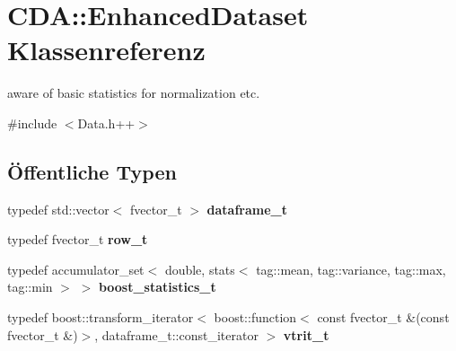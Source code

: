 \hypertarget{classCDA_1_1EnhancedDataset}{
\section{CDA::EnhancedDataset Klassenreferenz}
\label{classCDA_1_1EnhancedDataset}
}


aware of basic statistics for normalization etc.  




{\ttfamily \#include $<$Data.h++$>$}

\subsection*{Öffentliche Typen}
\begin{DoxyCompactItemize}
\item 
\hypertarget{classCDA_1_1EnhancedDataset_ac48f706bc85385da7b78ff9229666475}{
typedef std::vector$<$ fvector\_\-t $>$ {\bfseries dataframe\_\-t}}
\label{classCDA_1_1EnhancedDataset_ac48f706bc85385da7b78ff9229666475}

\item 
\hypertarget{classCDA_1_1EnhancedDataset_ad01be5e014bc9a5232102fae6759caad}{
typedef fvector\_\-t {\bfseries row\_\-t}}
\label{classCDA_1_1EnhancedDataset_ad01be5e014bc9a5232102fae6759caad}

\item 
\hypertarget{classCDA_1_1EnhancedDataset_ad125a62150f81238cd207baaa057b4ff}{
typedef accumulator\_\-set$<$ double, stats$<$ tag::mean, tag::variance, tag::max, tag::min $>$ $>$ {\bfseries boost\_\-statistics\_\-t}}
\label{classCDA_1_1EnhancedDataset_ad125a62150f81238cd207baaa057b4ff}

\item 
\hypertarget{classCDA_1_1EnhancedDataset_adecd4f314f8fc01ba75b08ca053ba561}{
typedef boost::transform\_\-iterator$<$ boost::function$<$ const fvector\_\-t \&(const fvector\_\-t \&)$>$, dataframe\_\-t::const\_\-iterator $>$ {\bfseries vtrit\_\-t}}
\label{classCDA_1_1EnhancedDataset_adecd4f314f8fc01ba75b08ca053ba561}

\end{DoxyCompactItemize}
